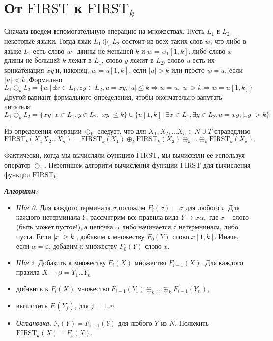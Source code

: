 \documentclass[12pt]{article}
\theoremstyle{definiton}
\theoremstyle{definition}
\theoremstyle{definition}
\theoremstyle{definition}
\let\leq\leqslant
\let\geq\geqslant
\let\es\emptyset
\let\eps\varepsilon
\def\first{\mathrm{ FIRST} }
\begin{document}
\section{От $\first$ к $\first_k$}

Сначала введём вспомогательную операцию на множествах. Пусть $L_1$ и $L_2$ некоторые языки.  Тогда язык $L_1 \oplus_k L_2$ состоит из всех таких слов $w$, что либо в языке $L_1$ есть слово $w_1$ длины не меньшей $k$ и $w = w_1[1,k]$, либо слово $x$ длины не большей $k$ лежит в $L_1$, слово $y$ лежит в $L_2$, слово $u$ есть их конкатенация $xy$ и, наконец, $w = u[1,k]$, если $|u| > k$ или просто $w = u$, если $|u| < k$. Формально
$$
 	L_1 \oplus_k L_2 = \{ w\,|\, \exists x \in L_1, \exists y \in L_2, u = xy, |u| \leq k \Rightarrow w = u, |u| > k \Rightarrow w = u[1,k]  \}
$$ 
Другой вариант формального определения, чтобы окончательно запутать читателя:
$$
 	L_1 \oplus_k L_2 = \{ xy\,|\,  x \in L_1, y \in L_2,  |xy| \leq k   \} \cup \{ u[1,k] \,|\,  \exists x \in L_1, \exists y \in L_2, u = xy,  |xy| > k  \}
$$ 


Из определения операции $\oplus_k$ следует, что для $X_1, X_2,\ldots X_n \in N\cup T$ справедливо
 $$\first_k(X_1X_2\ldots X_n) = \first_k(X_1)\oplus_k \first_k(X_2)\oplus_k\ldots\oplus_k\first_k(X_n). $$ 

Фактически, когда мы вычисляли функцию $\first$, мы вычисляли её используя оператор $\oplus_1$. Перепишем алгоритм вычисления функции $\first$ для вычисления функции $\first_k$.

\begin{flushleft}
\emph{\textbf{Алгоритм}:} 
\end{flushleft}
\begin{itemize}
	\item[ ] \emph{Шаг 0.} Для каждого терминала $\sigma$ положим $F_i(\sigma) = \sigma$ для любого $i$. Для каждого нетерминала $Y$, рассмотрим все правила вида $Y \to x\alpha, $ где $x$ -- слово (быть может пустое!), а цепочка $\alpha$ либо начинается с нетермнинала, либо пуста. Если $|x| \geq k$ , добавим к множеству $F_0(Y) $ слово $ x[1,k]$. Иначе, если $\alpha = \eps$, добавим к множеству $F_0(Y) $ слово $x$.
	\item[ ] \emph{Шаг i.} Добавить к множеству $F_i(X)$ множество $F_{i-1}(X)$. Для каждого правила $X \to \beta = Y_1\ldots Y_n$
	\item[ ] \qquad добавить к $F_i(X)$ множество $F_{i-1}(Y_1)\oplus_k  \ldots \oplus_k F_{i-1}(Y_n)$, 
	\item[ ] \qquad вычислить $F_i(Y_j)$, для $j = 1..n$
	\item[ ] \emph{Остановка.} $F_i(Y) = F_{i-1}(Y)$ для любого $Y$ из $N$. Положить $\first_k(X) = F_i(X)$.
\end{itemize}
\end{document}
